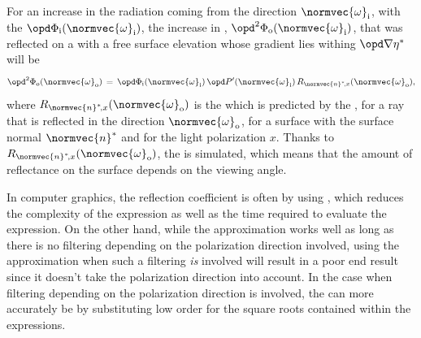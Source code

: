 For an increase in the radiation coming from the direction $\normvec{\omega}_{\text{i}}$, with the  $\opd \Phi_{\text{i}}(\normvec{\omega}_{\text{i}})$, the increase in , $\opd^2 \Phi_{\text{o}}(\normvec{\omega}_{\text{i}})$, that was reflected on a \microfacet with a free surface elevation whose gradient lies withing $\opd\nabla\eta^*$ will be
%
\begin{equation} \label{eq:gradient_restricted_reflected_flux}
\opd^2 \Phi_{\text{o}}(\normvec{\omega}_{\text{o}}) \,=\, \opd \Phi_{\text{i}}(\normvec{\omega}_{\text{i}})\,\opd P'(\normvec{\omega}_{\text{i}})\,R_{\normvec{n}^*\!,x}(\normvec{\omega}_{\text{o}}),
\end{equation}
%
where $R_{\normvec{n}^*\!,x}(\normvec{\omega}_{\text{o}})$ is the  which is predicted by the , for a ray that is reflected in the direction $\normvec{\omega}_{\text{o}}$, for a surface with the surface normal $\normvec{n}^*$ and for the light polarization $x$. Thanks to $R_{\normvec{n}^*\!,x}(\normvec{\omega}_{\text{o}})$, the  is simulated, which means that the amount of reflectance on the surface depends on the viewing angle.

In computer graphics, the reflection coefficient is often \approximated by using , which reduces the complexity of the expression as well as the time required to evaluate the expression. On the other hand, while the approximation works well as long as there is no filtering depending on the polarization direction involved, using the approximation when such a filtering \emph{is} involved will result in a poor end result since it doesn't take the polarization direction into account. In the case when filtering depending on the polarization direction is involved, the  can more accurately be \approximated by substituting low order  for the square roots contained within the expressions.

